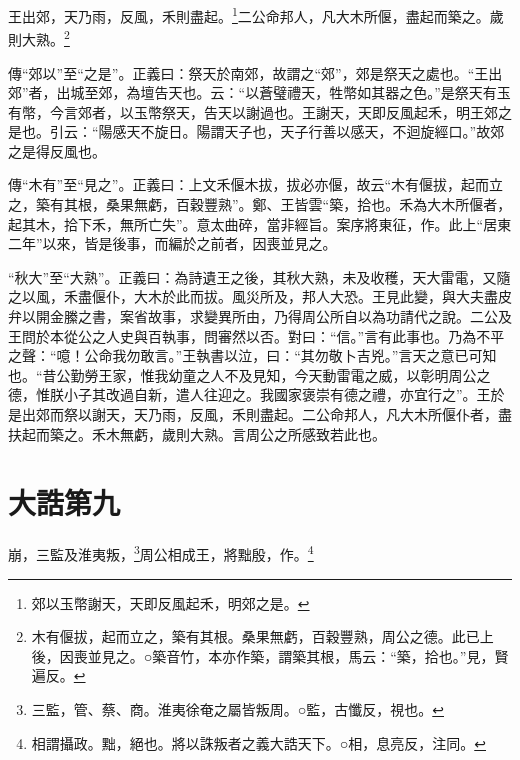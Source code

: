 王出郊，天乃雨，反風，禾則盡起。\footnote{郊以玉幣謝天，天即反風起禾，明郊之是。}二公命邦人，凡大木所偃，盡起而築之。歲則大熟。\footnote{木有偃拔，起而立之，築有其根。桑果無虧，百穀豐熟，周公之德。此已上後，因喪並見之。○築音竹，本亦作築，謂築其根，馬云：“築，拾也。”見，賢遍反。}

{\noindent\zhuan{}\fzbyks 傳“郊以”至“之是”。正義曰：祭天於南郊，故謂之“郊”，郊是祭天之處也。“王出郊”者，出城至郊，為壇告天也。云：“以蒼璧禮天，牲幣如其器之色。”是祭天有玉有幣，今言郊者，以玉幣祭天，告天以謝過也。王謝天，天即反風起禾，明王郊之是也。引云：“陽感天不旋日。陽謂天子也，天子行善以感天，不迴旋經口。”故郊之是得反風也。 \par}

{\noindent\zhuan{}\fzbyks 傳“木有”至“見之”。正義曰：上文禾偃木拔，拔必亦偃，故云“木有偃拔，起而立之，築有其根，桑果無虧，百穀豐熟”。鄭、王皆雲“築，拾也。禾為大木所偃者，起其木，拾下禾，無所亡失”。意太曲碎，當非經旨。案序將東征，作。此上“居東二年”以來，皆是後事，而編於之前者，因喪並見之。 \par}

{\noindent\shu{}\fzkt “秋大”至“大熟”。正義曰：為詩遺王之後，其秋大熟，未及收穫，天大雷電，又隨之以風，禾盡偃仆，大木於此而拔。風災所及，邦人大恐。王見此變，與大夫盡皮弁以開金縢之書，案省故事，求變異所由，乃得周公所自以為功請代之說。二公及王問於本從公之人史與百執事，問審然以否。對曰：“信。”言有此事也。乃為不平之聲：“噫！公命我勿敢言。”王執書以泣，曰：“其勿敬卜吉兇。”言天之意已可知也。“昔公勤勞王家，惟我幼童之人不及見知，今天動雷電之威，以彰明周公之德，惟朕小子其改過自新，遣人往迎之。我國家褒崇有德之禮，亦宜行之”。王於是出郊而祭以謝天，天乃雨，反風，禾則盡起。二公命邦人，凡大木所偃仆者，盡扶起而築之。禾木無虧，歲則大熟。言周公之所感致若此也。 \par}

\section{大誥第九}


崩，三監及淮夷叛，\footnote{三監，管、蔡、商。淮夷徐奄之屬皆叛周。○監，古懺反，視也。}周公相成王，將黜殷，作。\footnote{相謂攝政。黜，絕也。將以誅叛者之義大誥天下。○相，息亮反，注同。}

